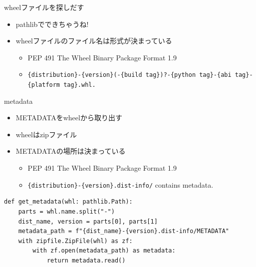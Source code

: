 \documentclass[presentation]{beamer}
\begin{document}
\begin{frame}[label={sec:orgd1423d2},fragile]{wheelファイルを探しだす}
 \begin{itemize}
\item pathlibでできちゃうね!
\item wheelファイルのファイル名は形式が決まっている
\begin{itemize}
\item PEP 491 The Wheel Binary Package Format 1.9
\item \texttt{\{distribution\}-\{version\}(-\{build tag\})?-\{python tag\}-\{abi tag\}-\{platform tag\}.whl.}
\end{itemize}
\end{itemize}
\end{frame}

\begin{frame}[label={sec:org59569c2},fragile]{metadata}
 \begin{itemize}
\item METADATAをwheelから取り出す
\item wheelはzipファイル
\item METADATAの場所は決まっている
\begin{itemize}
\item PEP 491 The Wheel Binary Package Format 1.9
\item \texttt{\{distribution\}-\{version\}.dist-info/} contains metadata.
\end{itemize}
\end{itemize}

\begin{verbatim}
def get_metadata(whl: pathlib.Path):
    parts = whl.name.split("-")
    dist_name, version = parts[0], parts[1]
    metadata_path = f"{dist_name}-{version}.dist-info/METADATA"
    with zipfile.ZipFile(whl) as zf:
        with zf.open(metadata_path) as metadata:
            return metadata.read()

\end{verbatim}
\end{frame}
\end{document}
